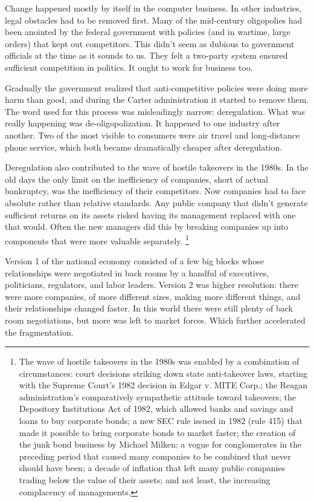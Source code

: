 \documentclass[12pt]{book}
\begin{document}
Change happened mostly by itself in the computer business. In other
industries, legal obstacles had to be removed first. Many of the
mid-century oligopolies had been anointed by the federal government with
policies (and in wartime, large orders) that kept out competitors. This
didn't seem as dubious to government officials at the time as it sounds
to us. They felt a two-party system ensured sufficient competition in
politics. It ought to work for business too.

Gradually the government realized that anti-competitive policies were
doing more harm than good, and during the Carter administration it
started to remove them. The word used for this process was misleadingly
narrow: deregulation. What was really happening was de-oligopolization.
It happened to one industry after another. Two of the most visible to
consumers were air travel and long-distance phone service, which both
became dramatically cheaper after deregulation.

Deregulation also contributed to the wave of hostile takeovers in the
1980s. In the old days the only limit on the inefficiency of companies,
short of actual bankruptcy, was the inefficiency of their competitors.
Now companies had to face absolute rather than relative standards. Any
public company that didn't generate sufficient returns on its assets
risked having its management replaced with one that would. Often the new
managers did this by breaking companies up into components that were
more valuable separately. \footnote{The wave of hostile takeovers in the 1980s was enabled by a
combination of circumstances: court decisions striking down state
anti-takeover laws, starting with the Supreme Court's 1982 decision in
Edgar v. MITE Corp.; the Reagan administration's comparatively
sympathetic attitude toward takeovers; the Depository Institutions Act
of 1982, which allowed banks and savings and loans to buy corporate
bonds; a new SEC rule issued in 1982 (rule 415) that made it possible to
bring corporate bonds to market faster; the creation of the junk bond
business by Michael Milken; a vogue for conglomerates in the preceding
period that caused many companies to be combined that never should have
been; a decade of inflation that left many public companies trading
below the value of their assets; and not least, the increasing
complacency of managements.}

Version 1 of the national economy consisted of a few big blocks whose
relationships were negotiated in back rooms by a handful of executives,
politicians, regulators, and labor leaders. Version 2 was higher
resolution: there were more companies, of more different sizes, making
more different things, and their relationships changed faster. In this
world there were still plenty of back room negotiations, but more was
left to market forces. Which further accelerated the fragmentation.
\end{document}

